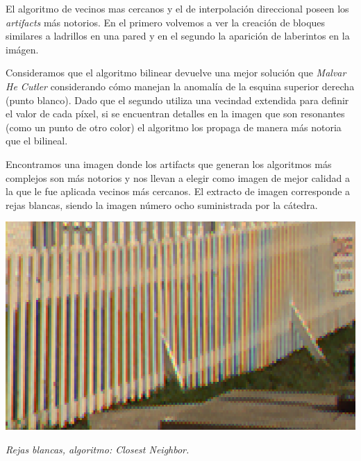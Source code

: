 El algoritmo de vecinos mas cercanos y el de interpolación direccional poseen los \textit{artifacts} más notorios. En el primero volvemos a ver la creación de bloques similares a ladrillos en una pared y en el segundo la aparición de laberintos en la imágen.

Consideramos que el algoritmo bilinear devuelve una mejor solución que \textit{Malvar He Cutler} considerando cómo manejan la anomalía de la esquina superior derecha (punto blanco). Dado que el segundo utiliza una vecindad extendida para definir el valor de cada píxel, si se encuentran detalles en la imagen que son resonantes (como un punto de otro color) el algoritmo los propaga de manera más notoria que el bilineal.

\vspace{\baselineskip}

Encontramos una imagen donde los artifacts que generan los algoritmos más complejos son más notorios y nos llevan a elegir como imagen de mejor calidad a la que le fue aplicada vecinos más cercanos. El extracto de imagen corresponde a rejas blancas, siendo la imagen número ocho suministrada por la cátedra.


	\begin{center}
		\includegraphics[scale=.5]{../enunciado/images_files/cualitativo/pharo_rails_closest.png}
		\vspace{2pt}
		\par
		\footnotesize\textit{Rejas blancas, algoritmo: Closest Neighbor.}
	\end{center}


